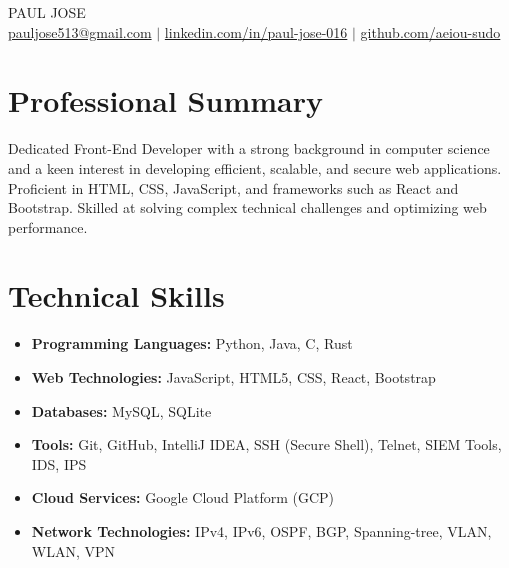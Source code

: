 \documentclass[a4paper,10pt]{article}
\begin{document}
\begin{center}
  {\huge \scshape PAUL JOSE} \\ \vspace{1pt}
  \small 
  \href{mailto:pauljose513@gmail.com}{pauljose513@gmail.com} $|$ 
  \href{https://www.linkedin.com/in/paul-jose-016}{linkedin.com/in/paul-jose-016} $|$ 
  \href{https://github.com/aeiou-sudo}{github.com/aeiou-sudo}
\end{center}

\section{Professional Summary}
Dedicated Front-End Developer with a strong background in computer science and a keen interest in developing efficient, scalable, and secure web applications. Proficient in HTML, CSS, JavaScript, and frameworks such as React and Bootstrap. Skilled at solving complex technical challenges and optimizing web performance.

\section{Technical Skills}
\begin{itemize}[leftmargin=0.15in, label={\textbullet}]
    \item \textbf{Programming Languages:} Python, Java, C, Rust
    \item \textbf{Web Technologies:} JavaScript, HTML5, CSS, React, Bootstrap
    \item \textbf{Databases:} MySQL, SQLite

    \item \textbf{Tools:} Git, GitHub, IntelliJ IDEA, SSH (Secure Shell), Telnet, SIEM Tools, IDS, IPS
    \item \textbf{Cloud Services:} Google Cloud Platform (GCP)
    \item \textbf{Network Technologies:} IPv4, IPv6, OSPF, BGP, Spanning-tree, VLAN, WLAN, VPN
\end{itemize}

\end{document}
